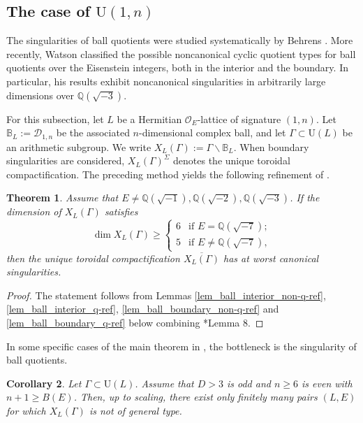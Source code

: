 \documentclass[11pt]{amsart}
\theoremstyle{plain}
\newtheorem{thm}{Theorem}[section]
\newtheorem{cor}[thm]{Corollary}
\theoremstyle{definition}
\numberwithin{equation}{section}
\def\dim{\mathop{\mathrm{dim}}\nolimits}
\def\OO{\mathscr{O}}
\def\U{\mathrm{U}}
\newcommand{\bbQ}{\mathbb{Q}}
\begin{document}
\subsection{The case of \texorpdfstring{$\U(1,n)$}{}}

The singularities of ball quotients were studied systematically
by Behrens \cite{behrens2012singularities}.  More recently,
Watson \cite{watson2026singularities} classified the possible noncanonical
cyclic quotient types for ball quotients over the Eisenstein
integers, both in the interior and the boundary.
In particular, his results exhibit noncanonical singularities
in arbitrarily large dimensions over
$\mathbb Q(\sqrt{-3})$.

For this subsection, let $L$ be a
Hermitian $\OO_E$-lattice of signature $(1,n)$.
Let $\mathbb{B}_L
  :=
  \mathcal{D}_{1,n}$
be the associated $n$-dimensional complex ball, and let
$\Gamma\subset \U(L)$ be an arithmetic subgroup.  We write $X_L(\Gamma):=\Gamma\backslash\mathbb B_L$.
When boundary singularities are considered, $X_L(\Gamma)^\Sigma$
denotes the unique toroidal compactification.
The preceding method yields the following refinement of \cite{behrens2012singularities}.

\begin{thm}\label{thm_ball_quot_singularity}
    Assume that $E \neq \bbQ(\sqrt{-1}), \bbQ(\sqrt{-2}), \bbQ(\sqrt{-3})$.
        If the dimension of $X_L(\Gamma)$ satisfies
        \[
        \dim X_L(\Gamma) \geq 
        \begin{cases}
            6 & \text{if $E = \bbQ(\sqrt{-7})$};\\
            5 & \text{if $E \neq \bbQ(\sqrt{-7})$,}
        \end{cases}
        \]
        then the unique toroidal compactification
$\overline{X_L(\Gamma)}$ has at worst canonical singularities.
\end{thm}
\begin{proof}
    The statement follows from Lemmas \ref{lem_ball_interior_non-q-ref}, \ref{lem_ball_interior_q-ref}, \ref{lem_ball_boundary_non-q-ref} and \ref{lem_ball_boundary_q-ref} below combining \cite{behrens2012singularities}*{Lemma 8}.
\end{proof}

In some specific cases of the main theorem in \cite{2025_HMY_Kodaira_dimension_ball_quotients}, the bottleneck is the singularity of ball quotients.

\begin{cor}
    Let $\Gamma\subset\U(L)$.
    Assume that $D>3$ is odd and $n\geq6$ is even with $n+1 \geq B(E)$.
        Then, up to scaling, there exist only finitely many pairs $(L,E)$ for which $X_L(\Gamma)$ is not of general type.
\end{cor}
\end{document}
